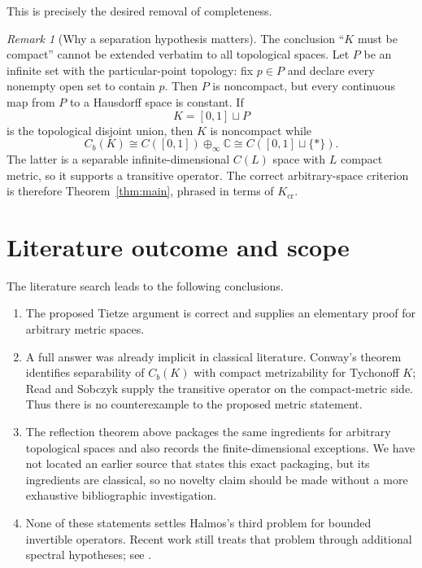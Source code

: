 \documentclass[11pt]{article}
\theoremstyle{remark}
\newtheorem{remark}[theorem]{Remark}
\newcommand{\Cb}{C_b}
\newcommand{\C}{\mathbb C}
\begin{document}
This is precisely the desired removal of completeness.

\begin{remark}[Why a separation hypothesis matters]
The conclusion ``$K$ must be compact'' cannot be extended verbatim to all
topological spaces.  Let $P$ be an infinite set with the particular-point
topology: fix $p\in P$ and declare every nonempty open set to contain $p$.
Then $P$ is noncompact, but every continuous map from $P$ to a Hausdorff space
is constant.  If
\[
  K=[0,1]\sqcup P
\]
is the topological disjoint union, then $K$ is noncompact while
\[
  \Cb(K)\cong C([0,1])\oplus_\infty\C
       \cong C([0,1]\sqcup\{*\}).
\]
The latter is a separable infinite-dimensional $C(L)$ space with $L$ compact
metric, so it supports a transitive operator.  The correct arbitrary-space
criterion is therefore Theorem~\ref{thm:main}, phrased in terms of
$K_{\mathrm{cr}}$.
\end{remark}

\section{Literature outcome and scope}

The literature search leads to the following conclusions.

\begin{enumerate}[leftmargin=2.2em]
  \item The proposed Tietze argument is correct and supplies an elementary
        proof for arbitrary metric spaces.
  \item A full answer was already implicit in classical literature.  Conway's
        theorem identifies separability of $\Cb(K)$ with compact metrizability
        for Tychonoff $K$; Read and Sobczyk supply the transitive operator on
        the compact-metric side.  Thus there is no counterexample to the
        proposed metric statement.
  \item The reflection theorem above packages the same ingredients for
        arbitrary topological spaces and also records the finite-dimensional
        exceptions.  We have not located an earlier source that states this
        exact packaging, but its ingredients are classical, so no novelty claim
        should be made without a more exhaustive bibliographic investigation.
  \item None of these statements settles Halmos's third problem for bounded
        invertible operators.  Recent work still treats that problem through
        additional spectral hypotheses; see \cite{JFJ}.
\end{enumerate}
\end{document}
